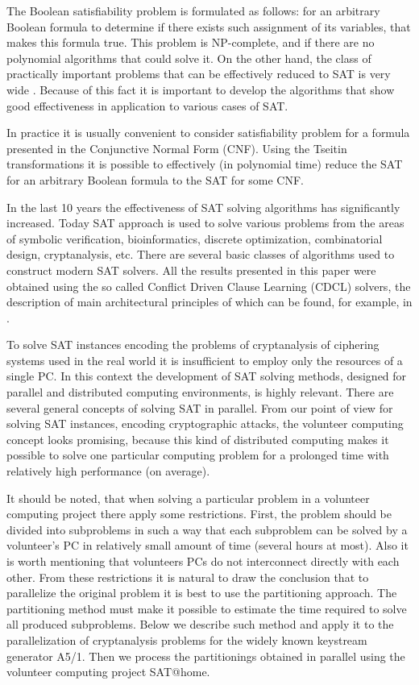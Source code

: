 \documentclass[runningheads,a4paper]{llncs}
\begin{document}
The Boolean satisfiability problem is formulated as follows: for an arbitrary Boolean formula to determine if there exists such assignment of its variables, that makes this formula true. This problem is NP-complete, and if  there are no polynomial algorithms that could solve it. On the other hand, the class of practically important problems that can be effectively reduced to SAT is very wide \cite{DBLP:series/faia/2009-185}. Because of this fact it is important to develop the algorithms that show good effectiveness in application to various cases of SAT.

In practice it is usually convenient to consider satisfiability problem for a formula presented in the Conjunctive Normal Form (CNF). Using the Tseitin transformations \cite{Tseitin83} it is possible to effectively (in polynomial time) reduce the SAT for an arbitrary Boolean formula to the SAT for some CNF.

In the last 10 years the effectiveness of SAT solving algorithms has significantly increased. Today SAT approach is used to solve various problems from the areas of symbolic verification, bioinformatics, discrete optimization, combinatorial design, cryptanalysis, etc. There are several basic classes of algorithms used to construct modern SAT solvers. All the results presented in this paper were obtained using the so called Conflict Driven Clause Learning (CDCL) solvers, the description of main architectural principles of which can be found, for example, in \cite{DBLP:series/faia/SilvaLM09}.

To solve SAT instances encoding the problems of cryptanalysis of ciphering systems used in the real world it is insufficient to employ only the resources of a single PC. In this context the development of SAT solving methods, designed for parallel and distributed computing environments, is highly relevant. There are several general concepts of solving SAT in parallel. From our point of view for solving SAT instances, encoding cryptographic attacks, the volunteer computing concept looks promising, because this kind of distributed computing makes it possible to solve one particular computing problem for a prolonged time with relatively high performance (on average).

It should be noted, that when solving a particular problem in a volunteer computing project there apply some restrictions. First, the problem should be divided into subproblems in such a way that each subproblem can be solved by a volunteer's PC in relatively small amount of time (several hours at most). Also it is worth mentioning that volunteers PCs do not interconnect directly with each other. From these restrictions it is natural to draw the conclusion that to parallelize the original problem it is best to use the partitioning approach. The partitioning method must make it possible to estimate the time required to solve all produced subproblems. Below we describe such method and apply it to the parallelization of cryptanalysis problems for the widely known keystream generator A5/1. Then we process the partitionings obtained in parallel using the volunteer computing project SAT@home.
\end{document}
